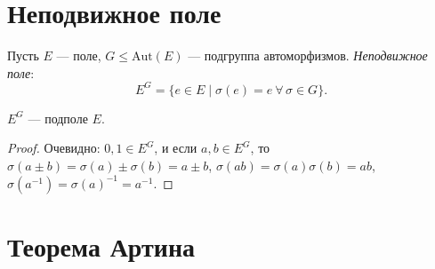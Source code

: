 \section{Неподвижное поле}

\begin{definition}
    Пусть $E$ --- поле, $G \leq \mathrm{Aut}(E)$ --- подгруппа автоморфизмов. \emph{Неподвижное поле}:
    \[
        E^G = \{e \in E \mid \sigma(e) = e\ \forall\, \sigma \in G\}.
    \]
\end{definition}

\begin{stmt}
    $E^G$ --- подполе $E$.
    \begin{proof}
        Очевидно: $0, 1 \in E^G$, и если $a, b \in E^G$, то $\sigma(a \pm b) = \sigma(a) \pm \sigma(b) = a \pm b$,
        $\sigma(ab) = \sigma(a)\sigma(b) = ab$, $\sigma(a^{-1}) = \sigma(a)^{-1} = a^{-1}$.
    \end{proof}
\end{stmt}


\section{Теорема Артина}

